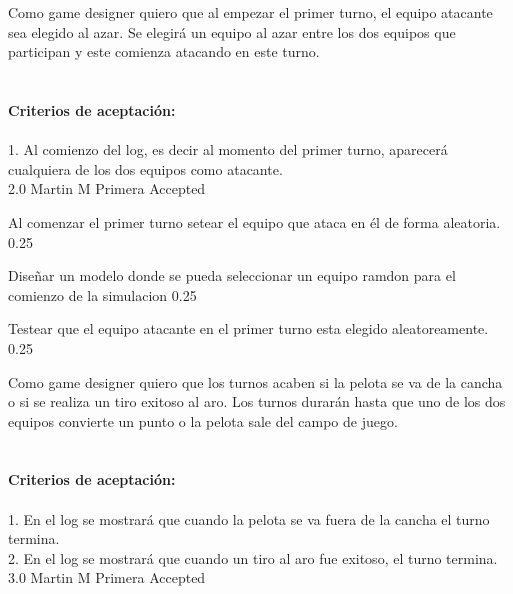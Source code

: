 \vspace{20pt}


	{Como game designer quiero que al empezar el primer turno, el equipo atacante sea elegido al azar.} %
	{Se elegir\'a un equipo al azar entre los dos equipos que participan y este comienza atacando en este turno.\\
  \\
  \\
\textbf{Criterios de aceptación:}\\
  \\
1. Al comienzo del log, es decir al momento del primer turno, aparecerá cualquiera de los dos equipos como atacante. \\
} %
	{} %
	{2.0} %
	{Martin M} %
	{Primera} %
	{Accepted} %

		{Al comenzar el primer turno setear el equipo que ataca en él de forma aleatoria.} %
		{} %
		{0.25} %
		{} %
		{} %
		{} %

		{Diseñar un modelo donde se pueda seleccionar un equipo ramdon para el comienzo de la simulacion} %
		{} %
		{0.25} %
		{} %
		{} %
		{} %


		{Testear que el equipo atacante en el primer turno esta elegido aleatoreamente.} %
		{} %
		{0.25} %
		{} %
		{} %
		{} %
\vspace{20pt}


	{Como game designer quiero que los turnos acaben si la pelota se va de la cancha o si se realiza un tiro exitoso al aro.} %
	{ Los turnos durarán hasta que uno de los dos equipos convierte un punto o la pelota sale del campo de juego. \\
  \\
  \\
\textbf{Criterios de aceptación:}\\
  \\
1. En el log se mostrará que cuando la pelota se va fuera de la cancha el turno termina.  \\
2. En el log se mostrará que cuando un tiro al aro fue exitoso, el turno termina. \\
} %
	{} %
	{3.0} %
	{Martin M} %
	{Primera} %
	{Accepted} %

